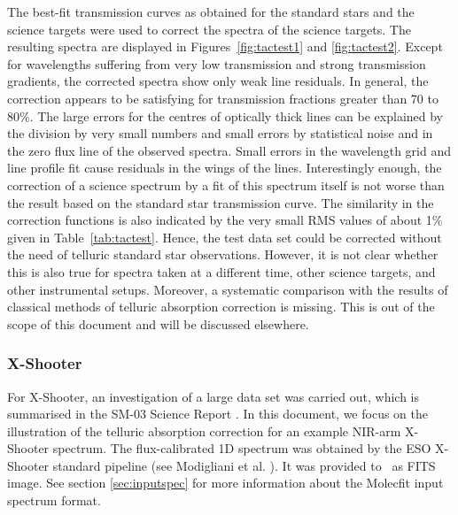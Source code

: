 The best-fit transmission curves as obtained for the standard stars and the
science targets were used to correct the spectra of the science targets. The
resulting spectra are displayed in Figures~\ref{fig:tactest1} and
\ref{fig:tactest2}. Except for wavelengths suffering from very low transmission
and strong transmission gradients, the corrected spectra show only weak line
residuals. In general, the correction appears to be satisfying for transmission
fractions greater than 70 to 80\%. The large errors for the centres of
optically thick lines can be explained by the division by very small numbers
and small errors by statistical noise and in the zero flux line of the observed
spectra. Small errors in the wavelength grid and line profile fit cause
residuals in the wings of the lines. Interestingly enough, the correction of a
science spectrum by a fit of this spectrum itself is not worse than the result
based on the standard star transmission curve. The similarity in the correction
functions is also indicated by the very small RMS values of about 1\% given in
Table~\ref{tab:tactest}. Hence, the test data set could be corrected without
the need of telluric standard star observations. However, it is not clear
whether this is also true for spectra taken at a different time, other science
targets, and other instrumental setups. Moreover, a systematic comparison with
the results of classical methods of telluric absorption correction is missing.
This is out of the scope of this document and will be discussed elsewhere.

\subsubsection{X-Shooter}\label{sec:xshooter}
For X-Shooter, an investigation of a large data set was carried out, which is
summarised in the SM-03 Science Report \cite{SM03SR}. In this document, we
focus on the illustration of the telluric absorption correction for an example
NIR-arm X-Shooter spectrum. The flux-calibrated 1D spectrum was obtained by the
ESO X-Shooter standard pipeline (see Modigliani et al. \cite{MOD10}). It was
provided to \mf\ as FITS image. See section \ref{sec:inputspec} for more
information about the Molecfit input spectrum format.

